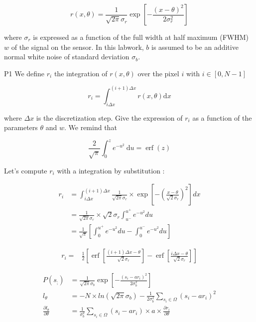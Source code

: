 \documentclass[10pt,letterpaper]{article}
\begin{document}
\begin{equation}
     r(x, \theta)=\frac{1}{\sqrt{2 \pi} \sigma_{r}} \exp \left[-\frac{(x-\theta)^{2}}{2 \sigma_{r}^{2}}\right]     
\end{equation}


where $\sigma_{r}$ is expressed as a function of the full width at half maximum (FWHM) $w$ of the signal on the sensor. In this labwork, $b$ is assumed to be an additive normal white noise of standard deviation $\sigma_{b}$.

P1 We define $r_{i}$ the integration of $r(x, \theta)$ over the pixel $i$ with $i \in[0, N-1]$


\begin{equation}
     r_{i}=\int_{i \Delta x}^{(i+1) \Delta x} r(x, \theta) \mathrm{d} x
\end{equation}


where $\Delta x$ is the discretization step. Give the expression of $r_{i}$ as a function of the parameters $\theta$ and $w$. We remind that


\begin{equation*}
\frac{2}{\sqrt{\pi}} \int_{0}^{z} e^{-u^{2}} \mathrm{~d} u=\operatorname{erf}(z)
\end{equation*}


Let's compute $r_i$ with a integration by substitution :


\begin{align}
     r_i & =\int_{i \Delta x}^{(i+1) \Delta x} \frac{1}{\sqrt{2 \pi} \sigma_r} \times \exp \left[-\left(\frac{x-\theta}{\sqrt{2} \sigma_r}\right)^2\right] d x \\
     & =\frac{1}{\sqrt{2 \pi} \sigma_r} \times \sqrt{2} \sigma_r \int_{u^{-}}^{u^{+}} e^{-u^2} d u \\
     & =\frac{1}{\sqrt{\pi}}\left[\int_0^{u^{+}} e^{-u^2} d u-\int_0^{u^{-}} e^{-u^2} d u\right]
\end{align}

\begin{align}
r_i= & \frac{1}{2}\left[\operatorname{erf}\left[\frac{(i+1) \Delta x-\theta}{\sqrt{2} \sigma_r}\right]-\operatorname{erf}\left[\frac{i \Delta x-\theta}{\sqrt{2} \sigma_r}\right]\right]
\end{align}


\begin{align}
P\left(s_{;}\right) &=\frac{1}{\sqrt{2 \pi} \sigma_b} \exp \left[-\frac{\left(s_i-a r_i\right)^2}{2 \sigma_b^2}\right] \\ 
l_\theta &=-N \times ln\left(\sqrt{2 \pi} \sigma_b\right) - \frac{1}{2 \sigma_b^2} \sum_{s_i  \in \Omega} \left(s_i-a r_i\right)^2 \\ 
\frac{\partial l_\theta}{\partial \theta} &=\frac{1}{\sigma_b^2} \sum_{s_i \in \Omega}\left(s_i-a r_i\right) \times a \times \frac{\partial r_i}{\partial \theta} 
\end{align}
\end{document}
